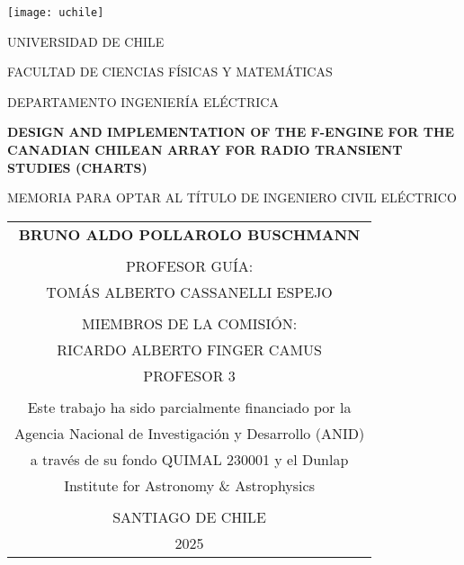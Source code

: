 \documentclass[
	12pt,
	letterpaper,
  oneside
  ]{book}
\begin{document}
  \thispagestyle{empty}
	\def\arraystretch{1.15}
  
  \begin{minipage}[t]{0.125\linewidth}
    \texttt{[image: uchile]}
  \end{minipage}
  \begin{minipage}[b]{0.8\linewidth}
    \MakeUppercase{Universidad de Chile}

    \MakeUppercase{Facultad de Ciencias Físicas y Matemáticas}

    \MakeUppercase{Departamento Ingeniería Eléctrica}
	\end{minipage}

	\begin{center}
    \vspace{1.5cm}

    \MakeUppercase{\textbf{Design and implementation of the F-engine for the Canadian Chilean Array for Radio Transient Studies (CHARTS)}}

    \vspace{1.5cm}


    \MakeUppercase{Memoria para optar al título de ingeniero civil eléctrico}
	
    \vfill

    \begin{tabular}{c}
      \MakeUppercase{\textbf{Bruno Aldo Pollarolo Buschmann}} \\
      \vspace{1.0cm} \\
      PROFESOR GUÍA: \\
      TOMÁS ALBERTO CASSANELLI ESPEJO \\
      \vspace{0.5cm} \\
      MIEMBROS DE LA COMISIÓN: \\
      RICARDO ALBERTO FINGER CAMUS \\
      PROFESOR 3 \\
      \vspace{0.5cm} \\
      Este trabajo ha sido parcialmente financiado por la \\
      Agencia Nacional de Investigación y Desarrollo (ANID) \\
      a través de su fondo QUIMAL 230001 y el Dunlap \\
      Institute for Astronomy \& Astrophysics \\
      \vspace{0.5cm} \\
      \MakeUppercase{Santiago de Chile} \\
      \MakeUppercase{2025}
    \end{tabular}

	\end{center}
\end{document}
